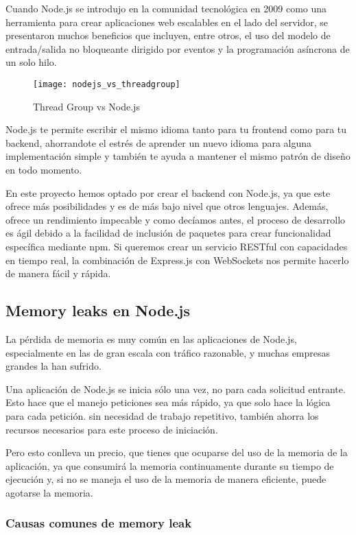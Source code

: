 Cuando Node.js se introdujo en la comunidad tecnológica en 2009 como una herramienta para crear aplicaciones web escalables en el lado del servidor, se presentaron muchos beneficios que incluyen, entre otros, el uso del modelo de entrada/salida no bloqueante dirigido por eventos y la programación asíncrona de un solo hilo.

\begin{figure}[htp!]
  \centering
  \texttt{[image: nodejs\_vs\_threadgroup]}
  \caption{Thread Group vs Node.js}
  \label{fig:nodejs_vs_threadgroup}
\end{figure}

Node.js te permite escribir el mismo idioma tanto para tu frontend como para tu backend, ahorrandote el estrés de aprender un nuevo idioma para alguna implementación simple y también te ayuda a mantener el mismo patrón de diseño en todo momento.

En este proyecto hemos optado por crear el backend con Node.js, ya que este ofrece más posibilidades y es de más bajo nivel que otros lenguajes. Además, ofrece un rendimiento impecable y como decíamos antes, el proceso de desarrollo es ágil debido a la facilidad de inclusión de paquetes para crear funcionalidad específica mediante npm. Si queremos crear un servicio RESTful con capacidades en tiempo real, la combinación de Express.js con WebSockets nos permite hacerlo de manera fácil y rápida.

\subsection{Memory leaks en Node.js}

La pérdida de memoria es muy común en las aplicaciones de Node.js, especialmente en las de gran escala con tráfico razonable, y muchas empresas grandes la han sufrido.

Una aplicación de Node.js se inicia sólo una vez, no para cada solicitud entrante. Esto hace que el manejo peticiones sea más rápido, ya que solo hace la lógica para cada petición. sin necesidad de trabajo repetitivo, también ahorra los recursos necesarios para este proceso de iniciación.

Pero esto conlleva un precio, que tienes que ocuparse del uso de la memoria de la aplicación, ya que consumirá la memoria continuamente durante su tiempo de ejecución y, si no se maneja el uso de la memoria de manera eficiente, puede agotarse la memoria.

\subsubsection{Causas comunes de memory leak}

